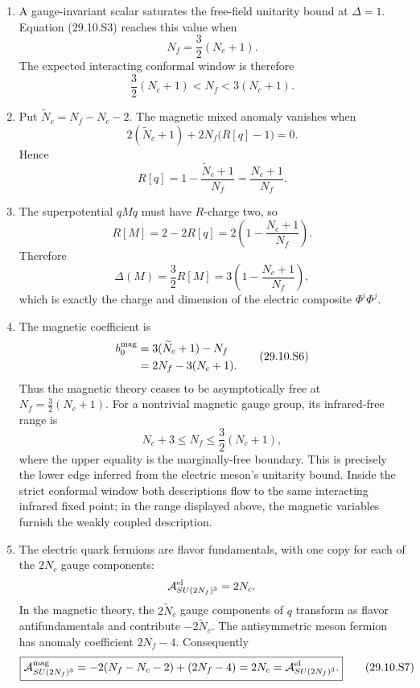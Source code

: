 \begin{enumerate}
\begin{enumerate}
    \item[(iv)]
    A gauge-invariant scalar saturates the free-field unitarity bound at
    \(\Delta=1\).  Equation (29.10.S3) reaches this value when
    \[
      N_f=\frac32(N_c+1).
    \]
    The expected interacting conformal window is therefore
    \[
      \boxed{\frac32(N_c+1)<N_f<3(N_c+1).}
      \tag{29.10.S4}
    \]

    \item[(v)]
    Put
    \(\widetilde N_c=N_f-N_c-2\).  The magnetic mixed anomaly vanishes
    when
    \[
      2(\widetilde N_c+1)
       +2N_f\bigl(R[q]-1\bigr)=0.
    \]
    Hence
    \[
      \boxed{R[q]
       =1-\frac{\widetilde N_c+1}{N_f}
       =\frac{N_c+1}{N_f}.}
      \tag{29.10.S5}
    \]

    \item[(vi)]
    The superpotential \(qMq\) must have \(R\)-charge two, so
    \[
      \boxed{R[M]=2-2R[q]
        =2\left(1-\frac{N_c+1}{N_f}\right).}
    \]
    Therefore
    \[
      \boxed{\Delta(M)=\frac32R[M]
        =3\left(1-\frac{N_c+1}{N_f}\right),}
    \]
    which is exactly the charge and dimension of the electric composite
    \(\Phi^i\Phi^j\).

    \item[(vii)]
    The magnetic coefficient is
    \[
      \begin{split}
      b_0^{\rm mag}
       &=3(\widetilde N_c+1)-N_f\\
       &=2N_f-3(N_c+1).
      \end{split}
      \tag{29.10.S6}
    \]
    Thus the magnetic theory ceases to be asymptotically free at
    \(N_f=\tfrac32(N_c+1)\).  For a nontrivial magnetic gauge group, its
    infrared-free range is
    \[
      \boxed{N_c+3\leq N_f\leq\frac32(N_c+1),}
    \]
    where the upper equality is the marginally-free boundary.  This is
    precisely the lower edge inferred from the electric meson's unitarity
    bound.  Inside the strict conformal window both descriptions flow to
    the same interacting infrared fixed point; in the range displayed
    above, the magnetic variables furnish the weakly coupled description.

    \item[(viii)]
    The electric quark fermions are flavor fundamentals, with one copy
    for each of the \(2N_c\) gauge components:
    \[
      \mathcal A_{SU(2N_f)^3}^{\rm el}=2N_c.
    \]
    In the magnetic theory, the \(2\widetilde N_c\) gauge components of
    \(q\) transform as flavor antifundamentals and contribute
    \(-2\widetilde N_c\).  The antisymmetric meson fermion has anomaly
    coefficient \(2N_f-4\).  Consequently
    \[
      \boxed{\mathcal A_{SU(2N_f)^3}^{\rm mag}
        =-2(N_f-N_c-2)+(2N_f-4)
        =2N_c
        =\mathcal A_{SU(2N_f)^3}^{\rm el}.}
      \tag{29.10.S7}
    \]
  \end{enumerate}


\end{enumerate}
